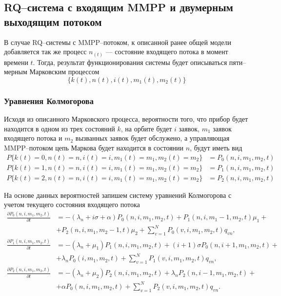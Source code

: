 \subsection{RQ--система с входящим MMPP и двумерным выходящим потоком} \label{section_map_twodim}
В случае RQ--системы с MMPP--потоком, к описанной ранее общей модели добавляется так же процесс $n_(t)$ --- состояние входящего потока в момент времени $t$. Тогда, результат функционирования системы будет описываться пяти--мерным Марковским процессом
\begin{equation*}
	\{k(t),n(t),i(t),m_{1}(t),m_{2}(t)\}
\end{equation*}

\subsubsection{Уравнения Колмогорова}

Исходя из описанного Марковского процесса, вероятности того, что прибор будет находится в одном из трех состояний $k$, на орбите будет $i$ заявок, $m_{1}$ заявок входящего потока и $m_{2}$ вызванных заявок будет обслужено, а управляющая MMPP--потоком цепь Маркова будет находится в состоянии $n$, будут иметь вид
\begin{equation*}
	\begin{split}
		P\{k(t)=0,n(t)=n,i(t)=i,m_{1}(t)=m_{1},m_{2}(t)=m_{2}\} &=P_{0}(n,i,m_{1},m_{2},t)\\
		P\{k(t)=1,n(t)=n,i(t)=i,m_{1}(t)=m_{1},m_{2}(t)=m_{2}\} &=P_{1}(n,i,m_{1},m_{2},t)\\
		P\{k(t)=2,n(t)=n,i(t)=i,m_{1}(t)=m_{1},m_{2}(t)=m_{2}\} &=P_{2}(n,i,m_{1},m_{2},t)
	\end{split}
\end{equation*} 

На основе данных вероятностей запишем систему уравнений Колмогорова с учетом текущего состояния входящего потока
\begin{equation} \label{kolmogorov_equations_twodim_map}
	\begin{split}
		\frac{{\partial P_{0}(n,i,m_{1},m_{2},t)}}{{\partial t}} &= -(\lambda_{n} + i\sigma + \alpha)P_{0}(n,i,m_{1},m_{2},t) + P_{1}(n,i,m_{1}-1,m_{2},t)\mu_{1} +\\  &+ P_{2}(n,i,m_{1},m_{2}-1,t)\mu_{2} + \sum_{v=1}^{N} P_{0}(v,i,m_{1},m_{2},t)q_{vn},
		\\
		\frac{{\partial P_{1}(n,i,m_{1},m_{2},t)}}{{\partial t}} &= -(\lambda_{n} + \mu_{1})P_{1}(n,i,m_{1},m_{2},t) + (i+1)\sigma P_{0}(n,i+1,m_{1},m_{2},t) +\\ &+ \lambda_{n}  P_{0}(i,m_{1},m_{2},t) + \sum_{v=1}^{N}P_{1}(v,i,m_{1},m_{2},t)q_{vn},
		\\
		\frac{{\partial P_{2}(n,i,m_{1},m_{2},t)}}{{\partial t}} &= -(\lambda_{n} + \mu_{2})P_{2}(n,i,m_{1},m_{2},t) + \lambda_{n} P_{2}(n,i-1,m_{1},m_{2},t)  +\\ &+ \alpha  P_{0}(n,i,m_{1},m_{2},t) +  \sum_{v=1}^{N}P_{2}(v,i,m_{1},m_{2},t)q_{vn}.
	\end{split}
\end{equation}	

